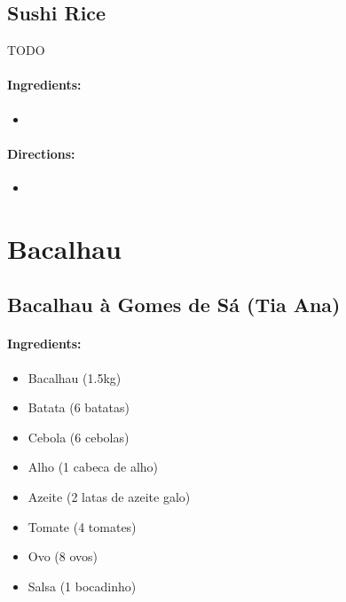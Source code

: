 \documentclass{article}
\begin{document}
\subsection{Sushi Rice}

TODO

\paragraph{Ingredients:}

\begin{itemize}
	\item
\end{itemize}

\paragraph{Directions:}
\begin{itemize}
	\item
\end{itemize}


\section{Bacalhau}

\subsection{Bacalhau à Gomes de Sá (Tia Ana)}

\paragraph{Ingredients:}

\begin{itemize}
	\item Bacalhau (1.5kg)
	\item Batata (6 batatas)
	\item Cebola (6 cebolas)
	\item Alho (1 cabeca de alho)
	\item Azeite (2 latas de azeite galo)
	\item Tomate (4 tomates)
	\item Ovo (8 ovos)
	\item Salsa (1 bocadinho)
\end{itemize}
\end{document}
